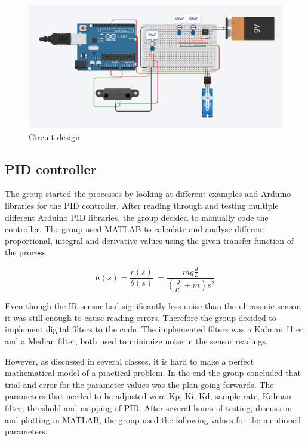 \begin{figure}[h]
    \centering
    \includegraphics[width = 1\textwidth]{Code/Images/Circuit-snip.png}
    \caption{Circuit design}
    \label{fig:Circuit design}
\end{figure}

\subsection{PID controller}

The group started the processes by looking at different examples and Arduino libraries for the PID controller. After reading through and testing multiple different Arduino PID libraries, the group decided to manually code the controller. The group used MATLAB to calculate and analyse different proportional, integral and derivative values using the given transfer function of the process.

\begin{equation}
    h(s) = \frac{r(s)}{\theta(s)}\ = \frac{mg\frac{d}{L}}{(\frac{J}{R^2}+m)s^2}
\end{equation}

Even though the IR-sensor had significantly less noise than the ultrasonic sensor, it was still enough to cause reading errors. Therefore the group decided to implement digital filters to the code. The implemented filters was a Kalman filter and a Median filter, both used to minimize noise in the sensor readings. 

However, as discussed in several classes, it is hard to make a perfect mathematical model of a practical problem. In the end the group concluded that trial and error for the parameter values was the plan going forwards. The parameters that needed to be adjusted were Kp, Ki, Kd, sample rate, Kalman filter, threshold and mapping of PID. After several hours of testing, discussion and plotting in MATLAB, the group used the following values for the mentioned parameters.\\

